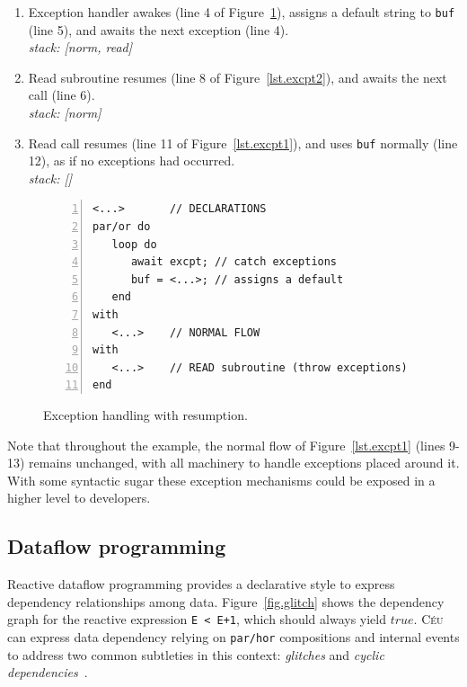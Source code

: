 \documentclass{acm_proc_article-sp}
\newcommand{\CEU}{\textsc{C\'{e}u}\xspace}
\newcommand{\code}[1] {{\small{\texttt{#1}}}}
\newcommand{\1}{\;}
\newcommand{\2}{\;\;}
\newcommand{\3}{\;\;\;}
\newcommand{\5}{\;\;\;\;\;}
\begin{document}
{\small
\begin{enumerate}[start=3]
\setlength{\itemsep}{0pt}
\item Exception handler awakes (line 4 of Figure~\ref{lst.excpt4}), assigns a 
default string to \code{buf} (line 5), and awaits the next exception (line 4).  \\
    \emph{stack: [norm, read]}
\item Read subroutine resumes (line 8 of Figure~\ref{lst.excpt2}), and awaits 
the next call (line 6). \\
    \emph{stack: [norm]}
\item Read call resumes (line 11 of Figure~\ref{lst.excpt1}), and uses 
\code{buf} normally (line 12), as if no exceptions had occurred. \\
    \emph{stack: []}
\end{enumerate}
}

\begin{figure}[t]
\begin{lstlisting}[numbers=left,xleftmargin=2em]
<...>       // DECLARATIONS
par/or do
   loop do
      await excpt; // catch exceptions
      buf = <...>; // assigns a default
   end
with
   <...>    // NORMAL FLOW
with
   <...>    // READ subroutine (throw exceptions)
end
\end{lstlisting}
\caption{ Exception handling with resumption.
\label{lst.excpt4}
}
\end{figure}

Note that throughout the example, the normal flow of Figure~\ref{lst.excpt1} 
(lines 9-13) remains unchanged, with all machinery to handle exceptions placed 
around it.
With some syntactic sugar these exception mechanisms could be exposed in a 
higher level to developers.

\subsection{Dataflow programming}
\label{sec.adv.frp}

Reactive dataflow programming provides a declarative style to express 
dependency relationships among data.
%
Figure~\ref{fig.glitch} shows the dependency graph for the reactive expression 
\code{E~<~E+1}, which should always yield $true$.
%
\CEU can express data dependency relying on \code{par/hor} compositions and 
internal events to address two common subtleties in this context: 
\emph{glitches} and \emph{cyclic dependencies}~\cite{frp.survey}.
\end{document}
